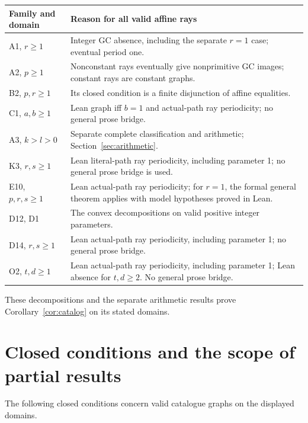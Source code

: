 \documentclass[11pt]{amsart}
\theoremstyle{definition}\newtheorem{definition}{Definition}
\begin{document}
\begin{center}\small
\begin{tabular}{p{}p{}}\toprule
Family and domain & Reason for all valid affine rays\\\midrule
A1, $r\ge1$ & Integer GC absence, including the separate $r=1$ case; eventual period one.\\
A2, $p\ge1$ & Nonconstant rays eventually give nonprimitive GC images; constant rays are constant graphs.\\
B2, $p,r\ge1$ & Its closed condition is a finite disjunction of affine equalities.\\
C1, $a,b\ge1$ & Lean graph iff $b=1$ and actual-path ray periodicity; no general prose bridge.\\
A3, $k>l>0$ & Separate complete classification and arithmetic; Section~\ref{sec:arithmetic}.\\
K3, $r,s\ge1$ & Lean literal-path ray periodicity, including parameter 1; no general prose bridge is used.\\
E10, $p,r,s\ge1$ & Lean actual-path ray periodicity; for $r=1$, the formal general theorem applies with model hypotheses proved in Lean.\\
D12, D1 & The convex decompositions on valid positive integer parameters.\\
D14, $r,s\ge1$ & Lean actual-path ray periodicity, including parameter 1; no general prose bridge.\\
O2, $t,d\ge1$ & Lean actual-path ray periodicity, including parameter 1; Lean absence for $t,d\ge2$. No general prose bridge.\\\bottomrule
\end{tabular}
\end{center}
These decompositions and the separate arithmetic results prove
Corollary~\ref{cor:catalog} on its stated domains.

\section{Closed conditions and the scope of partial results}\label{sec:conditions}
The following closed conditions concern valid catalogue graphs on
the displayed domains.
\end{document}
